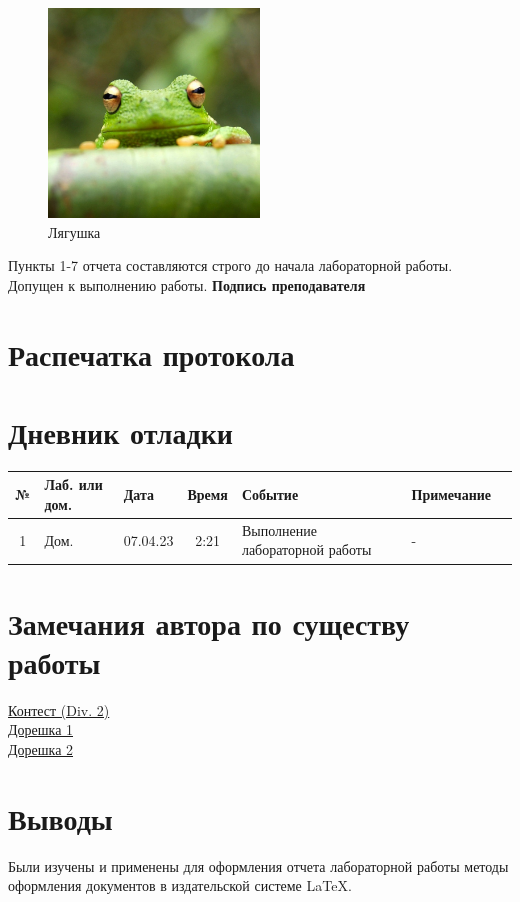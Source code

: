 \documentclass[12pt, letterpaper]{article}
\begin{document}
\begin{figure}[H]
\centering
\includegraphics[width=0.5\textwidth]{frog.jpg}
\caption{\label{fig:frog}Лягушка}
\end{figure}
Пункты 1-7 отчета составляются строго до начала лабораторной работы. Допущен к выполнению работы.
\textbf{Подпись преподавателя}
\section{Распечатка протокола}
\section{Дневник отладки}
\begin{tabular}{|c|p{1cm}|p{1.5cm}|c|p{2.5cm}|p{2cm}|p{2.25cm}|}
    \hline
    № & Лаб. или дом. & Дата & Время & Событие & Примечание\\
    \hline
    1 & Дом. & 07.04.23 & 2:21 & Выполнение лабораторной работы & -\\
    \hline
\end{tabular}
\section{Замечания автора по существу работы}
\href{https://codeforces.com/contest/1798/submission/199301228}{Контест (Div. 2)}\\
\href{https://codeforces.com/contest/1798/submission/201243811}{Дорешка 1}\\
\href{https://codeforces.com/contest/1798/submission/201242217}{Дорешка 2}
\section{Выводы}
Были изучены и применены для оформления отчета лабораторной работы методы оформления документов в издательской системе \LaTeX.
\end{document}
